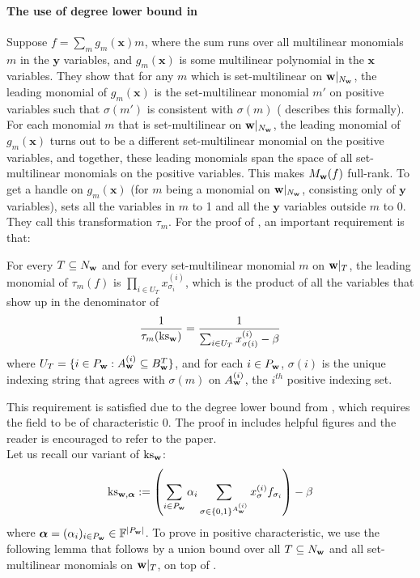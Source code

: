 \documentclass[11pt]{article}
\newcommand{\Boo}{\{0,1 \}}
\newcommand{\F}{\mathbb{F}}
\begin{document}
\paragraph{The use of degree lower bound in \cite{GHT}} Suppose $f = \sum_{m}g_m(\mathbf{x})m$, where the sum runs over all multilinear monomials $m$ in the $\mathbf{y}$ variables, and $g_m(\mathbf{x})$ is some multilinear polynomial in the $\mathbf{x}$ variables. They show that for any $m$ which is set-multilinear on $\mathbf{w}|_{N_{\mathbf{w}}}$, the leading monomial of $g_m(\mathbf{x})$ is the set-multilinear monomial $m'$ on positive variables such that $\sigma(m')$ is consistent with $\sigma(m)$ (\cite{GHT} describes this formally). For each monomial $m$ that is set-multilinear on $\mathbf{w}|_{N_{\mathbf{w}}}$, the leading monomial of $g_m(\mathbf{x})$ turns out to be a different set-multilinear monomial on the positive variables, and together, these leading monomials span the space of all set-multilinear monomials on the positive variables. This makes $M_{\mathbf{w}}(f)$ full-rank. To get a handle on $g_m(\mathbf{x})$ (for $m$ being a monomial on $\mathbf{w}|_{N_{\mathbf{w}}}$, consisting only of $\mathbf{y}$ variables), \cite{GHT} sets all the variables in $m$ to 1 and all the $\mathbf{y}$ variables outside $m$ to 0. They call this transformation $\tau_m$. For the proof of , an important requirement is that:
\begin{displayquote}For every $T\subseteq N_{\mathbf{w}}$ and for every set-multilinear monomial $m$ on $\mathbf{w}|_T$, the leading monomial of $\tau_m(f)$ is $\prod_{i\in U_T}x_{\sigma_i}^{(i)}$, which is the product of all the variables that show up in the denominator of $$\frac{1}{\tau_m(\operatorname{ks}_{\mathbf{w}})} = \frac{1}{\sum_{i\in U_T}x_{\sigma(i)}^{(i)} - \beta}$$ where $U_T = \{i \in P_{\mathbf{w}}: A_{\mathbf{w}}^{(i)} \subseteq B_{\mathbf{w}}^T\}$, and for each $i \in P_{\mathbf{w}}$, $\sigma(i)$ is the unique indexing string that agrees with $\sigma(m)$ on $A_{\mathbf{w}}^{(i)}$, the $i^{th}$ positive indexing set.
\end{displayquote}
This requirement is satisfied due to the degree lower bound from \cite{FSTW21}, which requires the field to be of characteristic 0. The proof in \cite{GHT} includes helpful figures and the reader is encouraged to refer to the paper.\\
Let us recall our variant of $\operatorname{ks}_{\mathbf{w}}$:
\begin{equation}
    \kswnew{\bfalpha}:= \left ( \sum_{i\in P_\bfw}\alpha_i\sum_{\sigma \in \Boo^{\Aw^{(i)}}} x_{\sigma}^{(i)}f_{\sigma_i} \right ) - \beta
\end{equation}
where $\bfalpha = (\alpha_i)_{i\in P_\bfw} \in \F^{|P_\bfw|}$. To prove  in positive characteristic, we use the following lemma that follows by a union bound over all $T\subseteq N_{\mathbf{w}}$ and all set-multilinear monomials on $\mathbf{w}|_{T}$, on top of .
\end{document}
